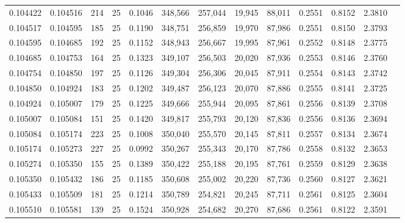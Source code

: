 \begin{tabular}{rrrrrrrrrrrrr}
0.104422 & 0.104516 &   214 &  25 &                                     0.1046 & 348,566 & 257,044 &  19,945 &  88,011 & 0.2551 & 0.8152 & 2.3810 \\
0.104517 & 0.104595 &   185 &  25 &                                     0.1190 & 348,751 & 256,859 &  19,970 &  87,986 & 0.2551 & 0.8150 & 2.3793 \\
0.104595 & 0.104685 &   192 &  25 &                                     0.1152 & 348,943 & 256,667 &  19,995 &  87,961 & 0.2552 & 0.8148 & 2.3775 \\
0.104685 & 0.104753 &   164 &  25 &                                     0.1323 & 349,107 & 256,503 &  20,020 &  87,936 & 0.2553 & 0.8146 & 2.3760 \\
0.104754 & 0.104850 &   197 &  25 &                                     0.1126 & 349,304 & 256,306 &  20,045 &  87,911 & 0.2554 & 0.8143 & 2.3742 \\
0.104850 & 0.104924 &   183 &  25 &                                     0.1202 & 349,487 & 256,123 &  20,070 &  87,886 & 0.2555 & 0.8141 & 2.3725 \\
0.104924 & 0.105007 &   179 &  25 &                                     0.1225 & 349,666 & 255,944 &  20,095 &  87,861 & 0.2556 & 0.8139 & 2.3708 \\
0.105007 & 0.105084 &   151 &  25 &                                     0.1420 & 349,817 & 255,793 &  20,120 &  87,836 & 0.2556 & 0.8136 & 2.3694 \\
0.105084 & 0.105174 &   223 &  25 &                                     0.1008 & 350,040 & 255,570 &  20,145 &  87,811 & 0.2557 & 0.8134 & 2.3674 \\
0.105174 & 0.105273 &   227 &  25 &                                     0.0992 & 350,267 & 255,343 &  20,170 &  87,786 & 0.2558 & 0.8132 & 2.3653 \\
0.105274 & 0.105350 &   155 &  25 &                                     0.1389 & 350,422 & 255,188 &  20,195 &  87,761 & 0.2559 & 0.8129 & 2.3638 \\
0.105350 & 0.105432 &   186 &  25 &                                     0.1185 & 350,608 & 255,002 &  20,220 &  87,736 & 0.2560 & 0.8127 & 2.3621 \\
0.105433 & 0.105509 &   181 &  25 &                                     0.1214 & 350,789 & 254,821 &  20,245 &  87,711 & 0.2561 & 0.8125 & 2.3604 \\
0.105510 & 0.105581 &   139 &  25 &                                     0.1524 & 350,928 & 254,682 &  20,270 &  87,686 & 0.2561 & 0.8122 & 2.3591 \\

\end{tabular}
